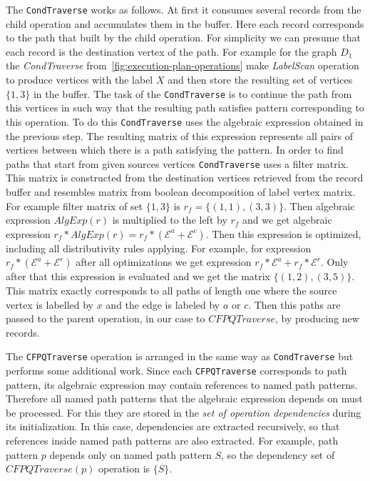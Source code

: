 The \lstinline{CondTraverse} works as follows. At first it consumes several records from the child operation and accumulates them in the buffer. Here each record corresponds to the path that built by the child operation. For simplicity we can presume that each record is the destination vertex of the path. For example for the graph $D_1$ the \textit{CondTraverse} from~\autoref{fig:execution-plan-operations} make \textit{LabelScan} operation to produce vertices with the label $X$ and then store the resulting set of vertices $\{1, 3\}$ in the buffer. The task of the \lstinline{CondTraverse} is to continue the path from this vertices in such way that the resulting path satisfies pattern corresponding to this operation. To do this \lstinline{CondTraverse} uses the algebraic expression obtained in the previous step. The resulting matrix of this expression represents all pairs of vertices between which there is a path satisfying the pattern. In order to find paths that start from given sources vertices \lstinline{CondTraverse} uses a filter matrix. This matrix is constructed from the destination vertices retrieved from the record buffer and resembles matrix from boolean decomposition of label vertex matrix. For example filter matrix of set $\{1, 3\}$ is $ r_{f}=\{(1, 1), (3, 3)\}$. Then algebraic expression $AlgExp(r)$ is multiplied to the left by $r_f$ and we get algebraic expression $r_f * AlgExp(r) = r_f * (\mathcal{E}^a + \mathcal{E}^c)$. Then this expression is optimized, including all distributivity rules applying. For example, for expression $r_f * (\mathcal{E}^a + \mathcal{E}^r)$ after all optimizations we get expression $r_f * \mathcal{E}^a + r_f * \mathcal{E}^r$. Only after that this expression is evaluated and we get the matrix $\{(1, 2), (3, 5)\}$. This matrix exactly corresponds to all paths of length one where the source vertex is labelled by $x$ and the edge is labeled by $a$ or $c$. Then this paths are passed to the parent operation, in our case to $CFPQTraverse$, by producing new records.

The \lstinline{CFPQTraverse} operation is arranged in the same way as \lstinline{CondTraverse} but performs some additional work. Since each \lstinline{CFPQTraverse} corresponds to path pattern, its algebraic expression may contain references to named path patterns. Therefore all named path patterns that the algebraic expression depends on must be processed. For this they are stored in the \textit{set of operation dependencies} during its initialization. In this case, dependencies are extracted recursively, so that references inside named path patterns are also extracted. For example, path pattern $p$ depends only on named path pattern $S$, so the dependency set of $CFPQTraverse(p)$ operation is $\{S\}$.

